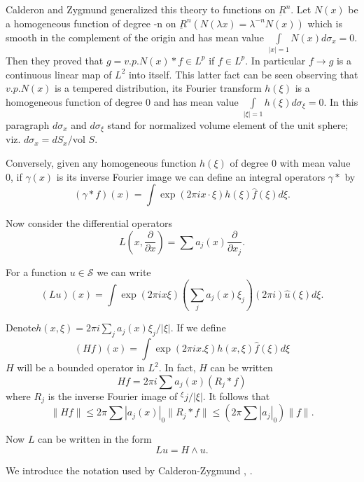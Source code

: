  Calderon and Zygmund \cite{key1} generalized this theory to functions on
 $\underbar{R}^n$. Let $N(x)$ be a homogeneous function of degree -n
 on $\underbar{R}^n (N (\lambda x) = \lambda^{-n} N(x))$ which is
 smooth in the complement of the origin and has mean value
 $\int\limits_{|x| =1} N(x) d \sigma _x = 0$. Then they proved that $g
 = v.p. N(x) * f \in L^p $ if $f \in L^p$. In particular $f \to g$ is
 a continuous linear map of $L^2$ into itself. This latter fact can be
 seen observing that $v.p. N(x)$ is a tempered distribution, its
 Fourier transform $h (\xi)$ is a homogeneous function of degree 0
 and has mean value $\int\limits_{|\xi| =1} h(\xi) d \sigma_\xi =
 0$. In this paragraph $d\sigma_{x}$ and $d\sigma_{\xi}$ stand for
 normalized volume element of the unit sphere; viz. $d\sigma_{x}=dS_{x}/\text{vol~}S$. 
 
 Conversely, given any homogeneous function $h(\xi)$ of degree $0$
 with mean value 0, if $\gamma (x)$ is its inverse Fourier image we
 can define an integral operators $\gamma *$ by 
 $$
 (\gamma * f) (x) = \int \exp (2 \pi ix \cdot \xi) h (\xi) \hat{f} (\xi)
 d\xi.  
 $$
 
 Now consider the differential operators  
 $$
 L \left(x, \frac{\partial}{\partial x} \right) = \sum a_j (x)
 \frac{\partial}{\partial x_j}. 
 $$

 For a function $u \in \mathscr{S}$ we can write  
 $$
 (Lu)(x) = \int \exp (2 \pi ix \xi) (\sum_j a_j (x) \xi_j) (2\pi i)
 \hat{u} (\xi) d \xi. 
 $$

Denote\pageoriginale $ h(x, \xi ) = 2 \pi i \sum\limits_{j} a_j (x) \xi_j /
|\xi|$. If we define  
$$
(Hf) (x) = \int \exp (2 \pi ix. \xi ) h(x, \xi ) \hat{f} (\xi ) d \xi 
$$
$H$ will be a bounded operator in $ L^2$. In fact, $H$ can be written 
\begin{equation*}
H f = 2 \pi i \sum a_j (x) (R_j *f) \tag{4.2}\label{chap4-eq4.2}
\end{equation*}
where $R_j$ is the inverse Fourier image of $^\xi j / |\xi|$. It
follows that  
$$
 \parallel Hf \parallel \leq 2 \pi \sum | a_j (x)|_0 \parallel R_j * f
 \parallel \leq (2 \pi \sum | a_j| _0 ) \| f \|. 
$$

Now $L$ can be written in the form 
$$
L u = H \wedge u.
$$

We introduce the notation used by Calderon-Zygmund \cite{key1}, \cite{key2}. 

